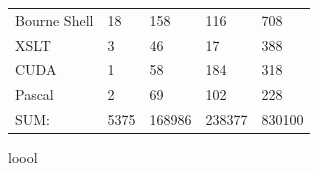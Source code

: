 \begin{table}[h]
\begin{tabular}{ l|l|l|l|l }
		Bourne Shell                   &  18          &  158         &   116        &    708\\
		XSLT                           &   3          &   46         &    17        &    388\\
		CUDA                           &   1          &   58         &   184        &    318\\
		Pascal                         &   2          &   69         &   102        &    228\\
		\hline
		SUM:                           &5375         &168986         &238377         &830100\\
		\hline
	\end{tabular}
    \normalfont
    \label{table:ParaviewStatistic}
\end{table}

loool

